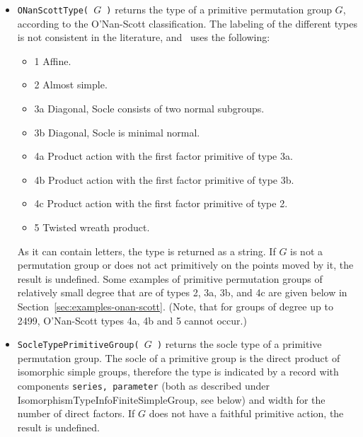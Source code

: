 \begin{itemize}
\item 
{\tt ONanScottType( $G$ )}
returns the type of a primitive permutation group $G$, according to the O'Nan-Scott classification. The
labeling of the different types is not consistent in the literature, and
\gap\ uses the following:
\begin{itemize}
\item 1 Affine.
\item 2 Almost simple.
\item 3a Diagonal, Socle consists of two normal subgroups.
\item 3b Diagonal, Socle is minimal normal.
\item 4a Product action with the first factor primitive of type 3a.
\item 4b Product action with the first factor primitive of type 3b.
\item 4c Product action with the first factor primitive of type 2.
\item 5 Twisted wreath product.
\end{itemize}
As it can contain letters, the type is returned as a string.
If $G$ is not a permutation group or does not act primitively on the points moved by it, the result is undefined.
Some examples of primitive permutation groups of relatively
small degree that are of types 2, 3a, 3b, and 4c are given below in Section~\ref{sec:examples-onan-scott}.
(Note, that for groups of degree up to 2499, O'Nan-Scott types 4a, 4b and 5
cannot occur.)


\item {\tt SocleTypePrimitiveGroup( $G$ )}
returns the socle type of a primitive permutation group. The socle of a primitive group is the direct product
of isomorphic simple groups, therefore the type is indicated by a record with
components {\tt series, parameter} 
(both as described under IsomorphismTypeInfoFiniteSimpleGroup, see below) and width for the
number of direct factors.
If $G$ does not have a faithful primitive action, the result is undefined.


\end{itemize}
